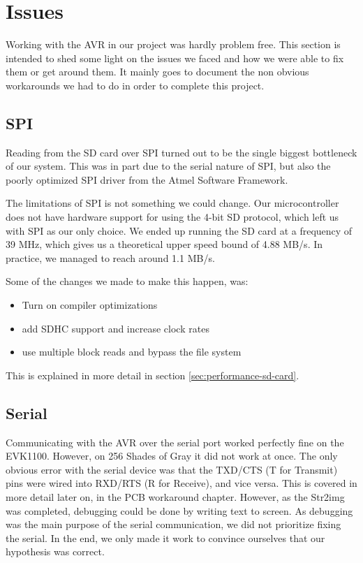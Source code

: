 \section{Issues}

Working with the AVR in our project was hardly problem free. This section is intended to shed some light on the issues we faced and how we were able to fix them or get around them. It mainly goes to document the non obvious workarounds we had to do in order to complete this project.

\subsection{SPI}
\label{sec:avr-spi-issues}
Reading from the \ac{SD} card over \ac{SPI} turned out to be the single biggest
bottleneck of our system. This was in part due to the serial nature of \ac{SPI},
but also the poorly optimized \ac{SPI} driver from the Atmel Software Framework.

The limitations of \ac{SPI} is not something we could change. Our
microcontroller does not have hardware support for using the 4-bit \ac{SD}
protocol, which left us with \ac{SPI} as our only choice. We ended up running
the \ac{SD} card at a frequency of 39 MHz, which gives us a theoretical upper
speed bound of 4.88 MB/s. In practice, we managed to reach around 1.1 MB/s.

Some of the changes we made to make this happen, was: \vspace{-1.0em}
\begin{itemize}
  \item Turn on compiler optimizations \vspace{-1.0em}
  \item add SDHC support and increase clock rates\vspace{-1.0em}
  \item use multiple block reads and bypass the file system
\end{itemize}

This is explained in more detail in section \ref{sec:performance-sd-card}.

\subsection{Serial}
\label{sec:avr-serial-issues}
Communicating with the AVR over the serial port worked perfectly fine on the
EVK1100. However, on 256 Shades of Gray it did not work at once. The
only obvious error with the serial device was that the TXD/CTS (T for Transmit)
pins were wired into RXD/RTS (R for Receive), and vice versa. This is covered 
in more detail later on, in the PCB workaround chapter. However, 
as the Str2img was completed, debugging could be done by writing text to screen.
As debugging was the main purpose of the serial communication, we did not prioritize
fixing the serial. In the end, we only made it work to convince ourselves 
that our hypothesis was correct.
